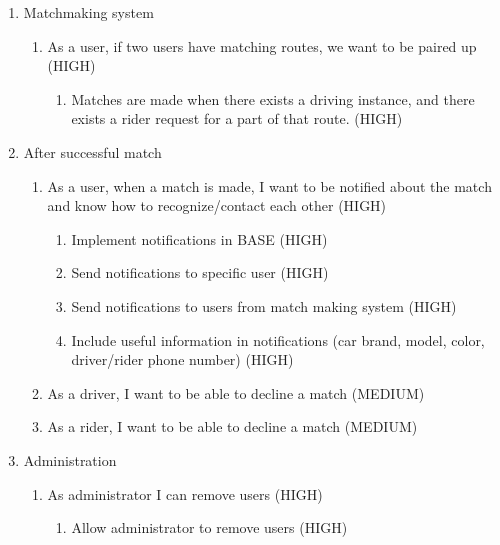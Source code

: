 \documentclass{article}
\begin{document}
\begin{enumerate}
  \item Matchmaking system
  \begin{enumerate}
      \item As a user, if two users have matching routes, we want to be paired up (HIGH)
      \begin{enumerate}
          \item Matches are made when there exists a driving instance, and there exists a rider request for a part of that route. (HIGH)
      \end{enumerate}
  \end{enumerate}
  
  \item After successful match
  \begin{enumerate}
      \item As a user, when a match is made, I want to be notified about the match and know how to recognize/contact each other (HIGH)
      \begin{enumerate}
          \item Implement notifications in BASE (HIGH)
          \item Send notifications to specific user (HIGH)
          \item Send notifications to users from match making system (HIGH)
          \item Include useful information in notifications (car brand, model, color, driver/rider phone number) (HIGH)
      \end{enumerate}
      \item As a driver, I want to be able to decline a match (MEDIUM)
      \item As a rider, I want to be able to decline a match (MEDIUM)
  \end{enumerate}
  
  \item Administration
  \begin{enumerate}
      \item As administrator I can remove users (HIGH)
      \begin{enumerate}
          \item Allow administrator to remove users (HIGH)
      \end{enumerate}
  \end{enumerate}
  
\end{enumerate}
\end{document}

